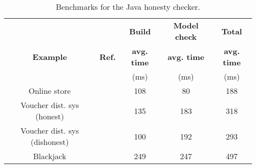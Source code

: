\begin{table}[t]
	\center
	\footnotesize
	\begin{tabular}{|c|c|ccc|}
		\hline
		&  & \textbf{Build} & \textbf{Model check} & \textbf{Total}  \\
		\textbf{Example}& \textbf{Ref.}	&	\textbf{avg. time}	&	\textbf{avg. time}	&	\textbf{avg. time} \\
		&	&	(ms)		&	(ms)		&	(ms) \\
		\hline
		\hline
		Online store					& \Cref{ex:online-store} 		& 108 	& 80 	& 188 \\
		\hline
		Voucher dist. sys (honest) 		& \Cref{ex:voucher-honest} 		& 135 	& 183 	& 318 \\
		\hline
		Voucher dist. sys (dishonest) 	& \Cref{ex:voucher-dishonest} 	& 100 	& 192 	& 293 \\
		\hline
		Blackjack 						& \Cref{ex:blackjack} 			& 249 	& 247	& 497 \\
		\hline
	\end{tabular}
	\caption{Benchmarks for the Java honesty checker.}
	\label{tab:benchmarks}
\end{table}

